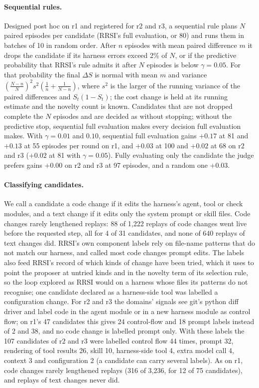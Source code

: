 \documentclass[11pt]{article}
\begin{document}
\paragraph{Sequential rules.} Designed post hoc on r1 and registered for r2 and r3, a sequential rule plans $N$ paired episodes per candidate (RRSI's full evaluation, or 80) and runs them in batches of 10 in random order. After $n$ episodes with mean paired difference $m$ it drops the candidate if its harness errors exceed 2\% of $N$, or if the predictive probability that RRSI's rule admits it after $N$ episodes is below $\gamma=0.05$. For that probability the final $\Delta S$ is normal with mean $m$ and variance $\left(\frac{N-n}{N}\right)^2 s^2\left(\frac1n+\frac1{N-n}\right)$, where $s^2$ is the larger of the running variance of the paired differences and $S_t(1-S_t)$; the cost change is held at its running estimate and the novelty count is known. Candidates that are not dropped complete the $N$ episodes and are decided as without stopping; without the predictive stop, sequential full evaluation makes every decision full evaluation makes. With $\gamma=0.01$ and $0.10$, sequential full evaluation gains $+0.17$ at 81 and $+0.13$ at 55 episodes per round on r1, and $+0.03$ at 100 and $+0.02$ at 68 on r2 and r3 ($+0.02$ at 81 with $\gamma=0.05$). Fully evaluating only the candidate the judge prefers gains $+0.00$ on r2 and r3 at 97 episodes, and a random one $+0.03$.

\paragraph{Classifying candidates.} We call a candidate a code change if it edits the harness's agent, tool or check modules, and a text change if it edits only the system prompt or skill files. Code changes rarely lengthened replays: 88 of 1{,}222 replays of code changes went live before the requested step, all for 4 of 31 candidates, and none of 640 replays of text changes did. RRSI's own component labels rely on file-name patterns that do not match our harness, and called most code changes prompt edits. The labels also feed RRSI's record of which kinds of change have been tried, which it uses to point the proposer at untried kinds and in the novelty term of its selection rule, so the loop explored as RRSI would on a harness whose files its patterns do not recognise; one candidate declared as a harness-side tool was labelled a configuration change. For r2 and r3 the domains' signals see git's python diff driver and label code in the agent module or in a new harness module as control flow; on r1's 47 candidates this gives 24 control-flow and 18 prompt labels instead of 2 and 38, and no code change is labelled prompt only. With these labels the 107 candidates of r2 and r3 were labelled control flow 44 times, prompt 32, rendering of tool results 26, skill 10, harness-side tool 4, extra model call 4, context 3 and configuration 2 (a candidate can carry several labels). As on r1, code changes rarely lengthened replays (316 of 3{,}236, for 12 of 75 candidates), and replays of text changes never did.
\end{document}
